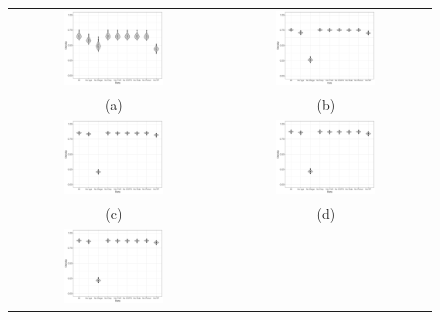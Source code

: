 \documentclass[12pt]{article}
\begin{document}
\begin{figure}
\centering
\begin{tabular}{cc}
   \includegraphics[width=0.5\textwidth]{vimp1_males.pdf}  &
   \includegraphics[width=0.5\textwidth]{vimp10_males.pdf} \\
   (a) & (b) \\
   \includegraphics[width=0.5\textwidth]{vimp20_males.pdf} & 
   \includegraphics[width=0.5\textwidth]{vimp30_males.pdf} \\
   (c) & (d) \\
   \includegraphics[width=0.5\textwidth]{vimp40_males.pdf} & \\

\end{tabular}
\end{figure}
\end{document}
